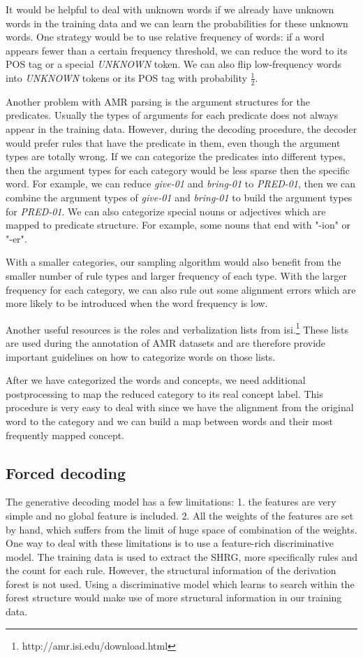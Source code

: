 It would be helpful to deal with unknown words if we already have unknown words in the training data and we can learn the probabilities for these unknown words.
One strategy would be to use relative frequency of words: if a word appears fewer than a certain frequency threshold, we can reduce the word to its POS tag or a special \textit{UNKNOWN} token. We can also flip low-frequency words into \textit{UNKNOWN} tokens or its POS tag with 
probability $\frac{1}{2}$.


Another problem with AMR parsing is the argument structures for the predicates. Usually the types of arguments for each predicate does not always appear in the training data.
However, during the decoding procedure, the decoder would prefer rules that have the predicate in them, even though the argument types are totally wrong.
If we can categorize the predicates into different types, then the argument types for each category would be less sparse then the specific word.
For example, we can reduce \textit{give-01} and \textit{bring-01} to \textit{PRED-01}, then we can combine the argument types of \textit{give-01} and \textit{bring-01} 
to build the argument types for \textit{PRED-01}. We can also categorize special nouns or adjectives which are mapped to predicate structure. For example, some nouns that end with "-ion" or "-er".


With a smaller categories, our sampling algorithm would also benefit from the smaller number of rule types and larger frequency of each type. With the larger frequency for each category, we can also rule out some alignment errors which are 
more likely to be introduced when the word frequency is low.


Another useful resources is the roles and verbalization lists from isi.\footnote{http://amr.isi.edu/download.html} These lists are used during
the annotation of AMR datasets and are therefore provide important guidelines on how to categorize words on those lists.


After we have categorized the words and concepts, we need additional postprocessing to map the reduced category to its real concept label. This
procedure is very easy to deal with since we have the alignment from the original word to the category and we can build a map between words and their most frequently mapped concept.
\subsection{Forced decoding}
The generative decoding model has a few limitations: 1. the features are very simple and no global feature is included. 2. All the weights of the features are
set by hand, which suffers from the limit of huge space of combination of the weights.
One way to deal with these limitations is to use a feature-rich discriminative model. The training data is used to extract the SHRG, more specifically
rules and the count for each rule. However, the structural information of the derivation forest is not used. Using a discriminative model which
learns to search within the forest structure would make use of more structural information in our training data.


